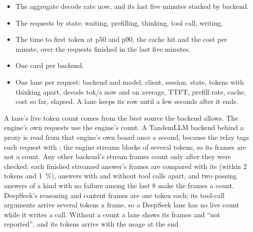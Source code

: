 
\begin{itemize}
\item The aggregate decode rate now, and its last five minutes stacked by backend.
\item The requests by state: waiting, prefilling, thinking, tool call, writing.
\item The time to first token at p50 and p90, the cache hit and the cost per minute, over the requests finished in the last five minutes.
\item One card per backend.
\item One lane per request: backend and model, client, session, state, tokens with thinking apart, decode tok/s now and on average, TTFT, prefill rate, cache, cost so far, elapsed. A lane keeps its row until a few seconds after it ends.
\end{itemize}

A lane's live token count comes from the best source the backend allows. The engine's own requests use the engine's count. A TandemLLM backend behind a proxy is read from that engine's own board once a second, because the relay tags each request with ; the engine streams blocks of several tokens, so its frames are not a count. Any other backend's stream frames count only after they were checked: each finished streamed answer's frames are compared with its  (within 2 tokens and 1~\%), answers with and without tool calls apart, and two passing answers of a kind with no failure among the last 8 make the frames a count. DeepSeek's reasoning and content frames are one token each; its tool-call arguments arrive several tokens a frame, so a DeepSeek lane has no live count while it writes a call. Without a count a lane shows its frames and \enquote{not reported}, and its tokens arrive with the usage at the end.

